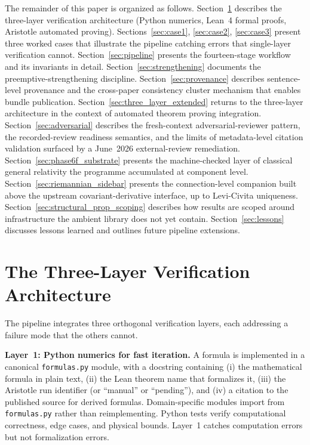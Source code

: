 \documentclass[11pt]{article}
\begin{document}
The remainder of this paper is organized as follows.
Section~\ref{sec:architecture} describes the three-layer
verification architecture (Python numerics, Lean~4 formal proofs,
Aristotle automated proving). Sections~\ref{sec:case1},
\ref{sec:case2}, \ref{sec:case3} present three worked cases that
illustrate the pipeline catching errors that single-layer
verification cannot. Section~\ref{sec:pipeline} presents the
fourteen-stage workflow and its invariants in detail.
Section~\ref{sec:strengthening} documents the preemptive-strengthening
discipline.
Section~\ref{sec:provenance} describes sentence-level provenance and
the cross-paper consistency cluster mechanism that enables bundle
publication. Section~\ref{sec:three_layer_extended} returns to the
three-layer architecture in the context of automated theorem proving
integration. Section~\ref{sec:adversarial} describes the
fresh-context adversarial-reviewer pattern, the recorded-review
readiness semantics, and the limits of metadata-level citation
validation surfaced by a June~2026 external-review remediation.
Section~\ref{sec:phase6f_substrate} presents the
machine-checked layer of classical general relativity the programme
accumulated at component level. Section~\ref{sec:riemannian_sidebar}
presents the connection-level companion built above the upstream
covariant-derivative interface, up to Levi-Civita uniqueness.
Section~\ref{sec:structural_prop_scoping} describes how results are
scoped around infrastructure the ambient library does not yet
contain. Section~\ref{sec:lessons} discusses lessons
learned and outlines future pipeline extensions.


\section{The Three-Layer Verification Architecture}
\label{sec:architecture}

The pipeline integrates three orthogonal verification layers, each
addressing a failure mode that the others cannot.

\textbf{Layer~1: Python numerics for fast iteration.} A formula is
implemented in a canonical \texttt{formulas.py} module, with a
docstring containing (i) the mathematical formula in plain text,
(ii) the Lean theorem name that formalizes it, (iii) the Aristotle
run identifier (or ``manual'' or ``pending''), and (iv) a citation
to the published source for derived formulas. Domain-specific
modules import from \texttt{formulas.py} rather than reimplementing.
Python tests verify computational correctness, edge cases, and
physical bounds. Layer~1 catches computation errors but not
formalization errors.
\end{document}
